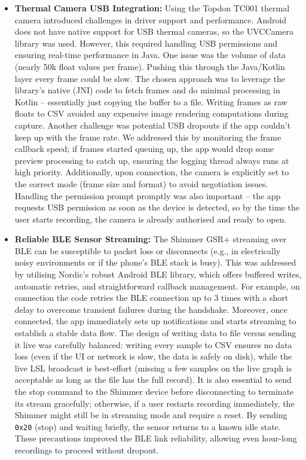 \begin{itemize}
    \item \textbf{Thermal Camera USB Integration:} Using the Topdon TC001 thermal camera introduced challenges in driver support and performance. Android does not have native support for USB thermal cameras, so the UVCCamera library was used. However, this required handling USB permissions and ensuring real-time performance in Java. One issue was the volume of data (nearly 50k float values per frame). Pushing this through the Java/Kotlin layer every frame could be slow. The chosen approach was to leverage the library's native (JNI) code to fetch frames and do minimal processing in Kotlin -- essentially just copying the buffer to a file. Writing frames as raw floats to CSV avoided any expensive image rendering computations during capture. Another challenge was potential USB dropouts if the app couldn't keep up with the frame rate. We addressed this by monitoring the frame callback speed; if frames started queuing up, the app would drop some preview processing to catch up, ensuring the logging thread always runs at high priority. Additionally, upon connection, the camera is explicitly set to the correct mode (frame size and format) to avoid negotiation issues. Handling the permission prompt promptly was also important -- the app requests USB permission as soon as the device is detected, so by the time the user starts recording, the camera is already authorised and ready to open.
    \item \textbf{Reliable BLE Sensor Streaming:} The Shimmer GSR+ streaming over BLE can be susceptible to packet loss or disconnects (e.g., in electrically noisy environments or if the phone's BLE stack is busy). This was addressed by utilising Nordic's robust Android BLE library, which offers buffered writes, automatic retries, and straightforward callback management. For example, on connection the code retries the BLE connection up to 3 times with a short delay to overcome transient failures during the handshake. Moreover, once connected, the app immediately sets up notifications and starts streaming to establish a stable data flow. The design of writing data to file versus sending it live was carefully balanced: writing every sample to CSV ensures no data loss (even if the UI or network is slow, the data is safely on disk), while the live LSL broadcast is best-effort (missing a few samples on the live graph is acceptable as long as the file has the full record). It is also essential to send the stop command to the Shimmer device before disconnecting to terminate its stream gracefully; otherwise, if a user restarts recording immediately, the Shimmer might still be in streaming mode and require a reset. By sending \texttt{0x20} (stop) and waiting briefly, the sensor returns to a known idle state. These precautions improved the BLE link reliability, allowing even hour-long recordings to proceed without dropout.

\end{itemize}
